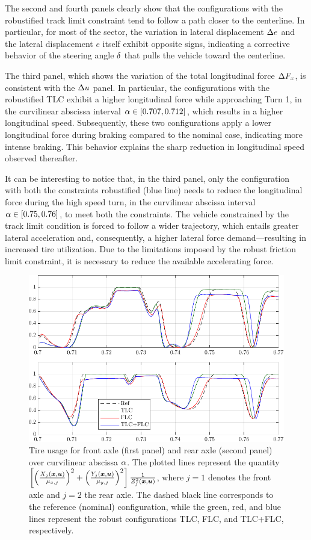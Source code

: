 The second and fourth panels clearly show that the configurations with the robustified track limit constraint tend to follow a path closer to the centerline. In particular, for most of the sector, the variation in lateral displacement $\Delta e$ and the lateral displacement $e$ itself exhibit opposite signs, indicating a corrective behavior of the steering angle $\delta$ that pulls the vehicle toward the centerline.

The third panel, which shows the variation of the total longitudinal force $\Delta F_x$, is consistent with the $\Delta u$ panel. In particular, the configurations with the robustified TLC exhibit a higher longitudinal force while approaching Turn 1, in the curvilinear abscissa interval $\alpha\in\left[0.707, 0.712\right]$, which results in a higher longitudinal speed. Subsequently, these two configurations apply a lower longitudinal force during braking compared to the nominal case, indicating more intense braking. This behavior explains the sharp reduction in longitudinal speed observed thereafter.

It can be interesting to notice that, in the third panel, only the configuration with both the constraints robustified (blue line) needs to reduce the longitudinal force during the high speed turn, in the curvilinear abscissa interval $\alpha\in\left[0.75, 0.76\right]$, to meet both the constraints. 
The vehicle constrained by the track limit condition is forced to follow a wider trajectory, which entails greater lateral acceleration and, consequently, a higher lateral force demand---resulting in increased tire utilization. Due to the limitations imposed by the robust friction limit constraint, it is necessary to reduce the available accelerating force.

\begin{figure}
	\centering
	\includegraphics{Fig/ol_saturation.pdf}
	\caption{Tire usage for front axle (first panel) and rear axle (second panel) over curvilinear abscissa $\alpha$. The plotted lines represent the quantity $\left[ \left( \frac{X_j(\boldsymbol{x},\boldsymbol{u})}{\mu_{x,j}} \right)^2+ \left( \frac{Y_j(\boldsymbol{x},\boldsymbol{u})}{\mu_{y,j}}\right)^2\right]\frac{1}{Z_j^2(\boldsymbol{x},\boldsymbol{u})}$, where $j=1$ denotes the front axle and $j=2$ the rear axle. The dashed black line corresponds to the reference (nominal) configuration, while the green, red, and blue lines represent the robust configurations TLC, FLC, and TLC+FLC, respectively.}
	\label{fig:ol_saturation}
\end{figure}

